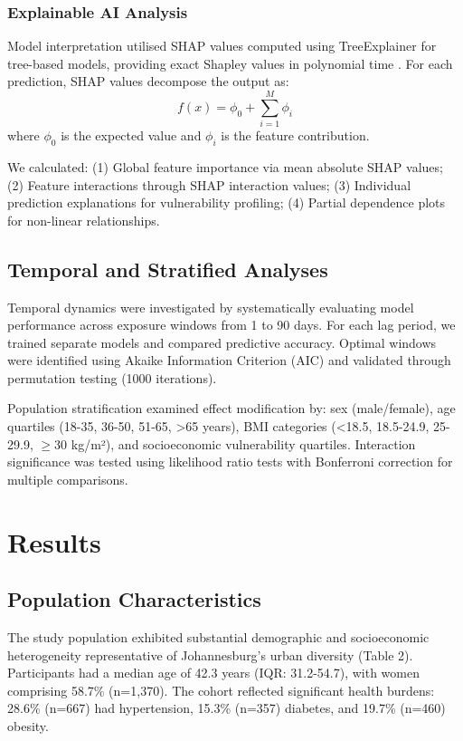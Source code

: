\documentclass[11pt,a4paper]{article}
\begin{document}
\subsubsection{Explainable AI Analysis}

Model interpretation utilised SHAP values computed using TreeExplainer for tree-based models, providing exact Shapley values in polynomial time \citep{Lundberg2020}. For each prediction, SHAP values decompose the output as:
$$f(x) = \phi_0 + \sum_{i=1}^{M} \phi_i$$
where $\phi_0$ is the expected value and $\phi_i$ is the feature contribution.

We calculated: (1) Global feature importance via mean absolute SHAP values; (2) Feature interactions through SHAP interaction values; (3) Individual prediction explanations for vulnerability profiling; (4) Partial dependence plots for non-linear relationships.

\subsection{Temporal and Stratified Analyses}

Temporal dynamics were investigated by systematically evaluating model performance across exposure windows from 1 to 90 days. For each lag period, we trained separate models and compared predictive accuracy. Optimal windows were identified using Akaike Information Criterion (AIC) and validated through permutation testing (1000 iterations).

Population stratification examined effect modification by: sex (male/female), age quartiles (18-35, 36-50, 51-65, >65 years), BMI categories (<18.5, 18.5-24.9, 25-29.9, $\geq$30 kg/m²), and socioeconomic vulnerability quartiles. Interaction significance was tested using likelihood ratio tests with Bonferroni correction for multiple comparisons.

\section{Results}

\subsection{Population Characteristics}

The study population exhibited substantial demographic and socioeconomic heterogeneity representative of Johannesburg's urban diversity (Table 2). Participants had a median age of 42.3 years (IQR: 31.2-54.7), with women comprising 58.7\% (n=1,370). The cohort reflected significant health burdens: 28.6\% (n=667) had hypertension, 15.3\% (n=357) diabetes, and 19.7\% (n=460) obesity.
\end{document}

